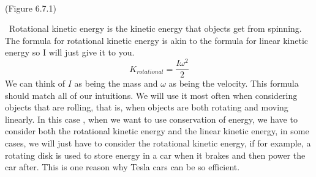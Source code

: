 \  
\
\begin{center}
(Figure 6.7.1)
\end{center}
\
Rotational kinetic energy is the kinetic energy that objects get from spinning. The formula for rotational kinetic energy is akin to the formula for linear kinetic energy so I will just give it to you. \begin{equation}K_{rotational}=\frac{I\omega^2}{2}\end{equation} We can think of $I$ as being the mass and $\omega$ as being the velocity. This formula should match all of our intuitions. We will use it most often when considering objects that are rolling, that is, when objects are both rotating and moving linearly. In this case , when we want to use conservation of energy, we have to consider both the rotational kinetic energy and the linear kinetic energy, in some cases, we will just have to consider the rotational kinetic energy, if for example, a rotating disk is used to store energy in a car when it brakes and then power the car after. This is one reason why Tesla cars can be so efficient.